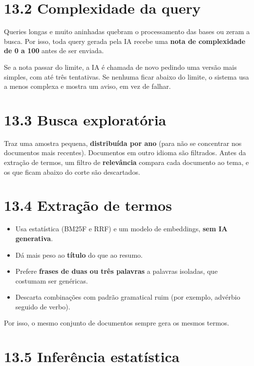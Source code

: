 \documentclass[
  brazilian,
  a4paper,12pt,oneside]{report}
\providecommand{\tightlist}{%
  \setlength{\itemsep}{0pt}\setlength{\parskip}{0pt}}
\begin{document}
\section{13.2 Complexidade da query}\label{complexidade-da-query}

Queries longas e muito aninhadas quebram o processamento das bases ou
zeram a busca. Por isso, toda query gerada pela IA recebe uma
\textbf{nota de complexidade de 0 a 100} antes de ser enviada.

Se a nota passar do limite, a IA é chamada de novo pedindo uma versão
mais simples, com até três tentativas. Se nenhuma ficar abaixo do
limite, o sistema usa a menos complexa e mostra um aviso, em vez de
falhar.

\section{13.3 Busca exploratória}\label{busca-exploratuxf3ria}

Traz uma amostra pequena, \textbf{distribuída por ano} (para não se
concentrar nos documentos mais recentes). Documentos em outro idioma são
filtrados. Antes da extração de termos, um filtro de \textbf{relevância}
compara cada documento ao tema, e os que ficam abaixo do corte são
descartados.

\section{13.4 Extração de termos}\label{extrauxe7uxe3o-de-termos}

\begin{itemize}
\tightlist
\item
  Usa estatística (BM25F e RRF) e um modelo de embeddings, \textbf{sem
  IA generativa}.
\item
  Dá mais peso ao \textbf{título} do que ao resumo.
\item
  Prefere \textbf{frases de duas ou três palavras} a palavras isoladas,
  que costumam ser genéricas.
\item
  Descarta combinações com padrão gramatical ruim (por exemplo, advérbio
  seguido de verbo).
\end{itemize}

Por isso, o mesmo conjunto de documentos sempre gera os mesmos termos.

\section{13.5 Inferência
estatística}\label{inferuxeancia-estatuxedstica}
\end{document}
